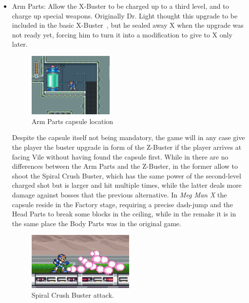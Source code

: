 \begin{itemize}
	\item Arm Parts: Allow the X-Buster to be charged up to a third level, and to charge up special weapons. Originally Dr. Light thought this upgrade to be included in the basic X-Buster~\cite{X:Manual}, but he sealed away X when the upgrade was not ready yet, forcing him to turn it into a modification to give to X only later.
	\begin{figure}[htp]
		\centering
		\includegraphics[width=0.4\textwidth]{figures/X1/Flame_mammoth/Flame_armor_2.jpg}
		\caption{Arm Parts capsule location}
	\end{figure}
	
	Despite the capsule itself not being mandatory, the game will in any case give the player the buster upgrade in form of the Z-Buster if the player arrives at facing Vile without having found the capsule first. While in \x there are no differences between the Arm Parts and the Z-Buster, in \mhx the former allow to shoot the Spiral Crush Buster, which has the same power of the second-level charged shot but is larger and hit multiple times, while the latter deals more damage against bosses that the previous alternative. In \textit{Meg Man X} the capsule reside in the Factory stage, requiring a precise dash-jump and the Head Parts to break some blocks in the ceiling, while in the remake it is in the same place the Body Parts was in the original game.
	\begin{figure}[htp]
		\centering
		\includegraphics[width=0.5\textwidth]{figures/X1/weapons/Buster_4.jpg}
		\caption{Spiral Crush Buster attack.}
	\end{figure}
	

\end{itemize}
